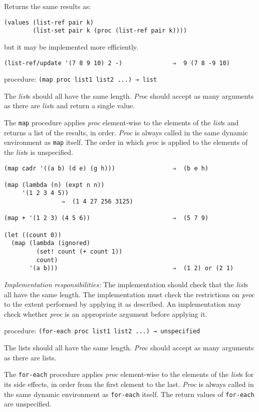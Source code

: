 Returns the same results as:

\begin{verbatim}
(values (list-ref pair k) 
        (list-set pair k (proc (list-ref pair k))))
\end{verbatim}

but it may be implemented more efficiently.

\begin{verbatim}
(list-ref/update '(7 8 9 10) 2 -)              ⇒  9 (7 8 -9 10)
\end{verbatim}

procedure: \texttt{(map\ proc\ list1\ list2\ ...)\ →\ list}

The \emph{list}s should all have the same length. \emph{Proc} should
accept as many arguments as there are \emph{list}s and return a single
value.

The \texttt{map} procedure applies \emph{proc} element-wise to the
elements of the \emph{list}s and returns a list of the results, in
order. \emph{Proc} is always called in the same dynamic environment as
\texttt{map} itself. The order in which \emph{proc} is applied to the
elements of the \emph{list}s is unspecified.

\begin{verbatim}
(map cadr '((a b) (d e) (g h)))                ⇒  (b e h)

(map (lambda (n) (expt n n))
     '(1 2 3 4 5))
                ⇒  (1 4 27 256 3125)

(map + '(1 2 3) (4 5 6))                       ⇒  (5 7 9)

(let ((count 0))
  (map (lambda (ignored)
         (set! count (+ count 1))
         count)
       '(a b)))                                ⇒  (1 2) or (2 1)
\end{verbatim}

\emph{Implementation responsibilities:} The implementation should check
that the \emph{list}s all have the same length. The implementation must
check the restrictions on \emph{proc} to the extent performed by
applying it as described. An implementation may check whether
\emph{proc} is an appropriate argument before applying it.

procedure: \texttt{(for-each\ proc\ list1\ list2\ ...)\ →\ unspecified}

The lists should all have the same length. \emph{Proc} should accept as
many arguments as there are lists.

The \texttt{for-each} procedure applies \emph{proc} element-wise to the
elements of the \emph{list}s for its side effects, in order from the
first element to the last. \emph{Proc} is always called in the same
dynamic environment as \texttt{for-each} itself. The return values of
\texttt{for-each} are unspecified.

